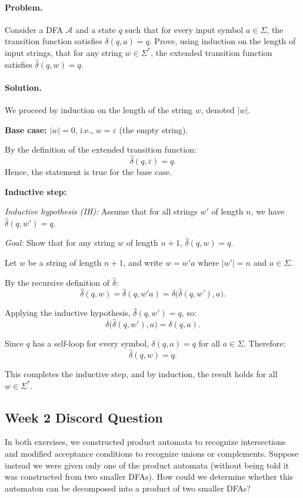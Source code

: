 \documentclass{article}
\theoremstyle{theorem}
\theoremstyle{definition}
\theoremstyle{remark}
\begin{document}
\paragraph{Problem.}
Consider a DFA $\mathcal{A}$ and a state $q$ such that for every input symbol $a \in \Sigma$, the transition function satisfies $\delta(q, a) = q$. Prove, using induction on the length of input strings, that for any string $w \in \Sigma^*$, the extended transition function satisfies $\hat{\delta}(q, w) = q$.

\paragraph{Solution.}

We proceed by induction on the length of the string $w$, denoted $|w|$.

\medskip
\noindent\textbf{Base case:} $|w| = 0$, i.e., $w = \varepsilon$ (the empty string).  

By the definition of the extended transition function:
\[
\hat{\delta}(q, \varepsilon) = q.
\]
Hence, the statement is true for the base case.

\medskip
\noindent\textbf{Inductive step:}  

\textit{Inductive hypothesis (IH):} Assume that for all strings $w'$ of length $n$, we have $\hat{\delta}(q, w') = q$.  

\textit{Goal:} Show that for any string $w$ of length $n+1$, $\hat{\delta}(q, w) = q$.  

Let $w$ be a string of length $n+1$, and write $w = w'a$ where $|w'| = n$ and $a \in \Sigma$.  

By the recursive definition of $\hat{\delta}$:
\[
\hat{\delta}(q, w) = \hat{\delta}(q, w'a) = \delta\big(\hat{\delta}(q, w'), a\big).
\]

Applying the inductive hypothesis, $\hat{\delta}(q, w') = q$, so:
\[
\delta\big(\hat{\delta}(q, w'), a\big) = \delta(q, a).
\]

Since $q$ has a self-loop for every symbol, $\delta(q, a) = q$ for all $a \in \Sigma$. Therefore:
\[
\hat{\delta}(q, w) = q.
\]

This completes the inductive step, and by induction, the result holds for all $w \in \Sigma^*$.

\subsection*{Week 2 Discord Question}
In both exercises, we constructed product automata to recognize intersections and modified acceptance conditions to recognize unions or complements. Suppose instead we were given only one of the product automata (without being told it was constructed from two smaller DFAs). How could we determine whether this automaton can be decomposed into a product of two smaller DFAs?
\end{document}
